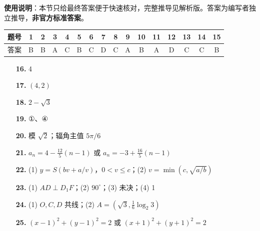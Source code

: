 
\begin{gknotice}
\textbf{使用说明}：本节只给最终答案便于快速核对，完整推导见解析版。答案为编写者独立推导，\textbf{非官方标准答案}。
\end{gknotice}

\begin{center}\begin{tabular}{cccccccccccccccc}
\toprule
题号 & 1 & 2 & 3 & 4 & 5 & 6 & 7 & 8 & 9 & 10 & 11 & 12 & 13 & 14 & 15 \\
\midrule
答案 & B & B & A & C & B & C & D & C & A & B & A & D & C & C & B \\
\bottomrule
\end{tabular}\end{center}

\begin{itemize}[leftmargin=2.6em]
  \item[\textbf{16.}] 4
  \item[\textbf{17.}] $(4,2)$
  \item[\textbf{18.}] $2-\sqrt3$
  \item[\textbf{19.}] ①、④
\end{itemize}

\begin{itemize}[leftmargin=2.6em]
  \item[\textbf{20.}] 模 $\sqrt2$；辐角主值 $5\pi/6$
  \item[\textbf{21.}] $a_n=4-\frac{12}{5}(n-1)$ 或 $a_n=-3+\frac{16}{5}(n-1)$
  \item[\textbf{22.}] (1) $y=S(bv+a/v)$，$0<v\le c$；(2) $v=\min(c,\sqrt{a/b})$
  \item[\textbf{23.}] (1) $AD\perp D_1F$；(2) $90^\circ$；(3) 未决；(4) 1
  \item[\textbf{24.}] (1) $O,C,D$ 共线；(2) $A=(\sqrt3,\frac16\log_2 3)$
  \item[\textbf{25.}] $(x-1)^2+(y-1)^2=2$ 或 $(x+1)^2+(y+1)^2=2$
\end{itemize}
